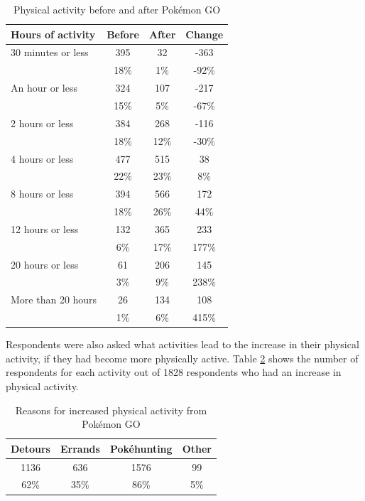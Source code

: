 \begin{table}[h]
	\centering
	\caption{Physical activity before and after Pokémon GO}
	\label{tbl:physical-activity-before-and-after}
	\begin{tabular}{|l|c|c|c|}
		\hline
		\textbf{Hours of activity} & \textbf{Before} & \textbf{After} & \textbf{Change} \\\hline\hline
		30 minutes or less	& 395 & 32 & -363\\
							& 18\% & 1\% & -92\%\\\hline
		An hour or less & 324 & 107 & -217\\
						& 15\% & 5\% & -67\%\\\hline
		2 hours or less & 384 & 268 & -116\\
						& 18\% & 12\% & -30\%\\\hline
		4 hours or less & 477 & 515 & 38\\
						& 22\% & 23\% & 8\%\\\hline
		8 hours or less & 394 & 566 & 172\\
						& 18\% & 26\% & 44\%\\\hline
		12 hours or less	& 132 & 365 & 233\\
							& 6\% & 17\% & 177\%\\\hline
		20 hours or less	& 61 & 206 & 145\\
							& 3\% & 9\% & 238\%\\\hline
		More than 20 hours	& 26 & 134 & 108\\
							& 1\% & 6\% & 415\%\\\hline
	\end{tabular}
\end{table}

Respondents were also asked what activities lead to the increase in their physical activity, if they had become more physically active. Table \ref{tbl:physical-activity-sources} shows the number of respondents for each activity out of 1828 respondents who had an increase in physical activity.

\begin{table}[h]
	\centering
	\caption{Reasons for increased physical activity from Pokémon GO}
	\label{tbl:physical-activity-sources}
	\begin{tabular}{|c|c|c|c|}
		\hline
		\textbf{Detours} & \textbf{Errands} & \textbf{Pokéhunting} & \textbf{Other}\\\hline\hline
		1136 & 636 & 1576 & 99\\
		62\% & 35\% & 86\% & 5\%\\\hline
	\end{tabular}
\end{table}

